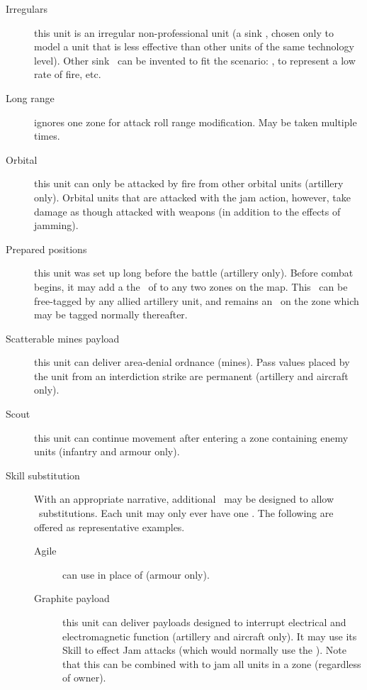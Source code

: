 \begin{description}
\item[Irregulars]
this unit is an irregular non-professional unit (a sink \Stunt, chosen only to model a unit that is less effective than other units of the same technology level). Other sink \Stunts\ can be invented to fit the scenario: , to represent a low rate of fire, etc.

\item[Long range]
ignores one zone for attack roll range modification. May be taken multiple times.

\item[Orbital]
this unit can only be attacked by fire from other orbital units (artillery only). Orbital units that are attacked with the jam action, however, take damage as though attacked with weapons (in addition to the effects of jamming).

\item[Prepared positions]
this unit was set up long before the battle (artillery only). Before combat begins, it may add a the \Aspect\ of  to any two zones on the map. This \Aspect\ can be free-tagged by any allied artillery unit, and remains an \Aspect\ on the zone which may be tagged normally thereafter.

\item[Scatterable mines payload]
this unit can deliver area-denial ordnance (mines). Pass values placed by the unit from an interdiction strike are permanent (artillery and aircraft only).

\item[Scout]
this unit can continue movement after entering a zone containing enemy units (infantry and armour only).

\item[Skill substitution]
With an appropriate narrative, additional \Stunts\ may be designed to allow \Skill\ substitutions. Each unit may only ever have one  \Stunt. The following are offered as representative examples.

\begin{description}
\item[Agile]
can use  in place of  (armour only).

\item[Graphite payload]
this unit can deliver payloads designed to interrupt electrical and electromagnetic function (artillery and aircraft only).  It may use its  Skill to effect Jam attacks (which would normally use the ). Note that this can be combined with  to jam all units in a zone (regardless of owner).


\end{description}
\end{description}
